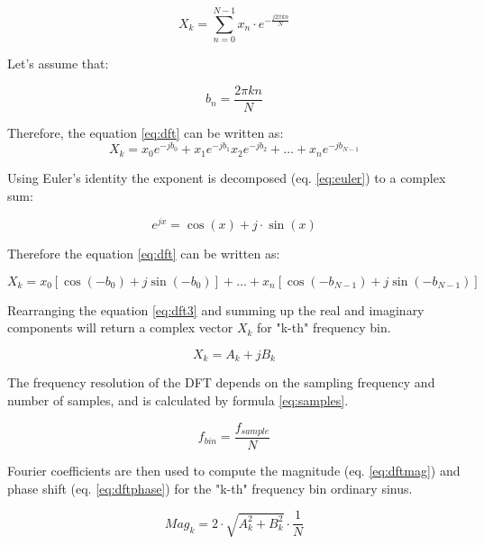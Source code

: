 \begin{equation} \label{eq:dft}
X_k = \sum_{n=0}^{N-1} x_n \cdot e^{-\frac{j2 \pi kn}{N}}
\end{equation}

Let's assume that:

\begin{equation} \label{eq:bn}
b_n = \frac{2 \pi k n}{N}
\end{equation}

Therefore, the equation \ref{eq:dft} can be written as:
\begin{equation} \label{eq:dft2}
X_k = x_{0} e^{-j b_{0}} + x_{1} e^{-j b_{1}} x_{2} e^{-j b_{2}} + \ldots + x_{n} e^{-j b_{N-1}}
\end{equation}

Using Euler's identity the exponent is decomposed (eq. \ref{eq:euler}) to a complex sum:

\begin{equation} \label{eq:euler}
e^{jx} = \cos(x) + j \cdot \sin(x)
\end{equation}

Therefore the equation \ref{eq:dft} can be written as:

\begin{equation} \label{eq:dft3}
X_k = x_0 [\cos(-b_{0}) + j \sin(-b_{0})] +  \ldots + x_n [\cos(-b_{N-1}) + j \sin(-b_{N-1})]
\end{equation}

Rearranging the equation \ref{eq:dft3} and summing up the real and imaginary components will return a complex vector $X_k$ for "k-th" frequency bin.

\begin{equation} \label{eq:complex}
X_k = A_k + j B_{k}
\end{equation}
 
The frequency resolution of the DFT depends on the sampling frequency and number of samples, and is calculated by formula \ref{eq:samples}. 

\begin{equation} \label{eq:samples}
f_{bin} = \frac{f_{sample}}{N}
\end{equation}

Fourier coefficients are then used to compute the magnitude (eq. \ref{eq:dftmag}) and phase shift (eq. \ref{eq:dftphase}) for the "k-th" frequency bin ordinary sinus.

\begin{equation} \label{eq:dftmag}
Mag_k = 2 \cdot \sqrt{A_{k}^{2} + B_{k}^{2}} \cdot \frac{1}{N}
\end{equation}

